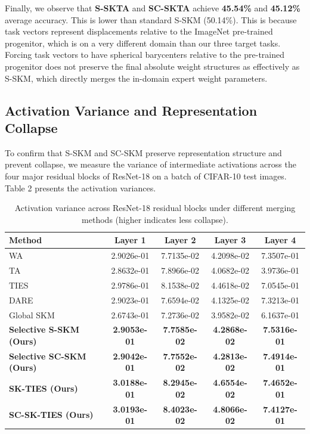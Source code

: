 \documentclass{article}
\begin{document}
Finally, we observe that \textbf{S-SKTA} and \textbf{SC-SKTA} achieve \textbf{45.54\%} and \textbf{45.12\%} average accuracy. This is lower than standard S-SKM (50.14\%). This is because task vectors represent displacements relative to the ImageNet pre-trained progenitor, which is on a very different domain than our three target tasks. Forcing task vectors to have spherical barycenters relative to the pre-trained progenitor does not preserve the final absolute weight structures as effectively as S-SKM, which directly merges the in-domain expert weight parameters.

\subsection{Activation Variance and Representation Collapse}
To confirm that S-SKM and SC-SKM preserve representation structure and prevent collapse, we measure the variance of intermediate activations across the four major residual blocks of ResNet-18 on a batch of CIFAR-10 test images. Table 2 presents the activation variances.

\begin{table}[h]
\caption{Activation variance across ResNet-18 residual blocks under different merging methods (higher indicates less collapse).}
\label{table:var}
\vskip 0.15in
\begin{center}
\begin{small}
\begin{tabular}{lcccc}
\toprule
\textbf{Method} & \textbf{Layer 1} & \textbf{Layer 2} & \textbf{Layer 3} & \textbf{Layer 4} \\
\midrule
WA & 2.9026e-01 & 7.7135e-02 & 4.2098e-02 & 7.3507e-01 \\
TA & 2.8632e-01 & 7.8966e-02 & 4.0682e-02 & 3.9736e-01 \\
TIES & 2.9786e-01 & 8.1538e-02 & 4.4618e-02 & 7.0545e-01 \\
DARE & 2.9023e-01 & 7.6594e-02 & 4.1325e-02 & 7.3213e-01 \\
Global SKM & 2.6743e-01 & 7.2736e-02 & 3.9582e-02 & 6.1637e-01 \\
\midrule
\textbf{Selective S-SKM (Ours)} & \textbf{2.9053e-01} & \textbf{7.7585e-02} & \textbf{4.2868e-02} & \textbf{7.5316e-01} \\
\textbf{Selective SC-SKM (Ours)} & \textbf{2.9042e-01} & \textbf{7.7552e-02} & \textbf{4.2813e-02} & \textbf{7.4914e-01} \\
\textbf{SK-TIES (Ours)} & \textbf{3.0188e-01} & \textbf{8.2945e-02} & \textbf{4.6554e-02} & \textbf{7.4652e-01} \\
\textbf{SC-SK-TIES (Ours)} & \textbf{3.0193e-01} & \textbf{8.4023e-02} & \textbf{4.8066e-02} & \textbf{7.4127e-01} \\
\bottomrule
\end{tabular}
\end{small}
\end{center}
\vskip -0.1in
\end{table}
\end{document}
